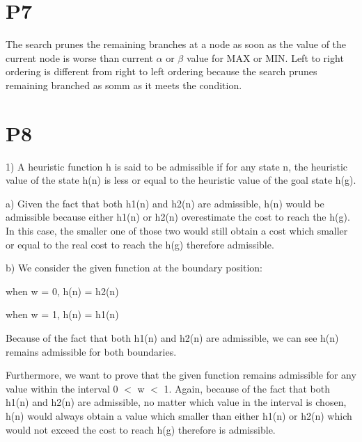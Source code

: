 \documentclass{article}
\begin{document}
\section*{P7}

\hspace{5mm}



\hspace{5mm}

The search prunes the remaining branches at a node as soon as the value of the current node is worse than current $\alpha$ or $\beta$ value for MAX or MIN. Left to right ordering is different from right to left ordering because the search prunes remaining branched as somm as it meets the condition.

\section*{P8}

\hspace{5mm} 

1) A heuristic function h is said to be admissible if for any state n, the heuristic value of the state h{\small (n)} is less or equal to the heuristic value of the goal state h{\small (g)}.

a) Given the fact that both h{\small 1(n)} and h{\small 2(n)} are admissible, h{\small (n)} would be admissible because either h{\small 1(n)} or h{\small 2(n)} overestimate the cost to reach the h{\small (g)}. In this case, the smaller one of those two would still obtain a cost which smaller or equal to the real cost to reach the h{\small (g)} therefore admissible.

b) We consider the given function at the boundary position:
\begin{center}

when w = 0, h{\small(n)} = h{\small 2(n)}

when w = 1, h{\small(n)} = h{\small 1(n)}

\end{center}

Because of the fact that both h{\small 1(n)} and h{\small 2(n)} are admissible, we can see h{\small(n)} remains admissible for both boundaries.

Furthermore, we want to prove that the given function remains admissible for any value within the interval 0 $<$ w $<$ 1. Again, because of the fact that both h{\small 1(n)} and h{\small 2(n)} are admissible, no matter which value in the interval is chosen,  h{\small (n)} would always obtain a value which smaller than either h{\small 1(n)} or h{\small 2(n)} which would not exceed the cost to reach h{\small (g)} therefore is admissible.
\end{document}
